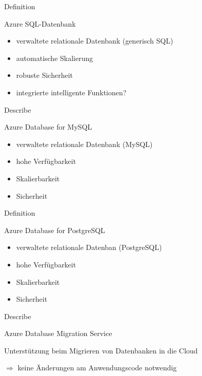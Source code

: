 \documentclass{scrartcl}
\newenvironment{flashcard}[2][]{%
    #1
    \vfill
    \centerline{\Large{#2}}
    \vfill
\newpage
}
{\newpage}
\begin{document}
    \begin{flashcard}[Definition]{Azure SQL-Datenbank}
        \begin{itemize}
            \item verwaltete relationale Datenbank (generisch SQL)
            \item automatische Skalierung
            \item robuste Sicherheit
            \item integrierte intelligente Funktionen?
        \end{itemize}
    \end{flashcard}

    \begin{flashcard}[Describe]{Azure Database for MySQL}
        \begin{itemize}
            \item verwaltete relationale Datenbank (MySQL)
            \item hohe Verfügbarkeit
            \item Skalierbarkeit
            \item Sicherheit
        \end{itemize}
    \end{flashcard}

    \begin{flashcard}[Definition]{Azure Database for PostgreSQL}
        \begin{itemize}
            \item verwaltete relationale Datenban (PostgreSQL)
            \item hohe Verfügbarkeit
            \item Skalierbarkeit
            \item Sicherheit
        \end{itemize}
    \end{flashcard}

    \begin{flashcard}[Describe]{Azure Database Migration Service}
        Unterstützung beim Migrieren von Datenbanken in die Cloud

        $\Rightarrow$ keine Änderungen am Anwendungscode notwendig
    \end{flashcard}
\end{document}
